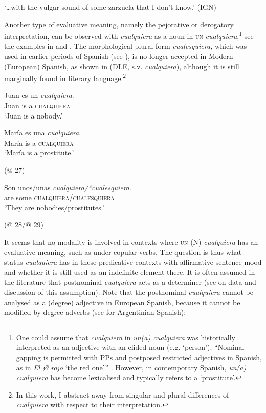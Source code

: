 \ex \label{bkm:Ref54686931-2} ‘…with the vulgar sound of some zarzuela that I don’t know.’ (IGN)

\z
\z 

Another type of evaluative meaning, namely the pejorative or derogatory interpretation, can be observed with \textit{cualquiera} as a noun in \textsc{un} \textit{cualquiera},\footnote{{One could assume that} {\textit{cualquiera}} {in} {\textit{un(a) cualquiera}} {was historically interpreted as an adjective with an elided noun (e.g. ‘person’). “Nominal gapping is permitted with PPs and postposed restricted adjectives in Spanish, as in} {\textit{El Ø rojo}} {‘the red one’” \citep[34]{Bosque2001}. However, in contemporary Spanish, \textit{un(a) cualquiera} has become lexicalised and typically refers to a ‘prostitute’.}} see the examples in  and . The morphological plural form \textit{cualesquiera,} which was used in earlier periods of Spanish (see ), is no longer accepted in Modern (European) Spanish, as shown in   (DLE, s.v. \textit{cualquiera}), although it is still marginally found in literary language:\footnote{{In this work, I abstract away from singular and plural differences of} {\textit{cualquiera}} {with respect to their interpretation.}}

\ea %
\label{bkm:Ref150778470} \gll Juan es un \textit{cualquiera}.\\
Juan is a \textsc{cualquiera}\\
  \glt ‘Juan is a nobody.’

  \citep[36]{Martinez2005}
\z


\ea %
\label{bkm:Ref150778472} \gll María es una \textit{cualquiera}.\\
María is a \textsc{cualquiera}\\
  \glt ‘María is a prostitute.’

  (@ 27)
\z


\ea %
\label{bkm:Ref533761216} \gll Son unos/unas \textit{cualquiera/*cualesquiera}.\\
are some \textsc{cualquiera}/\textsc{cualesquiera}\\
  \glt ‘They are nobodies/prostitutes.’

  (@ 28/@ 29)
\z

It seems that no modality is involved in contexts where \textsc{un} (N) \textit{cualquiera} has an evaluative meaning, such as under copular verbs. The question is thus what status \textit{cualquiera} has in these predicative contexts with affirmative sentence mood and whether it is still used as an indefinite element there. It is often assumed in the literature that postnominal \textit{cualquiera} acts as a determiner (see  on data and discussion of this assumption). Note that the postnominal \textit{cualquiera} cannot be analysed as a (degree) adjective in European Spanish, because it cannot be modified by degree adverbs (see  for Argentinian Spanish):

